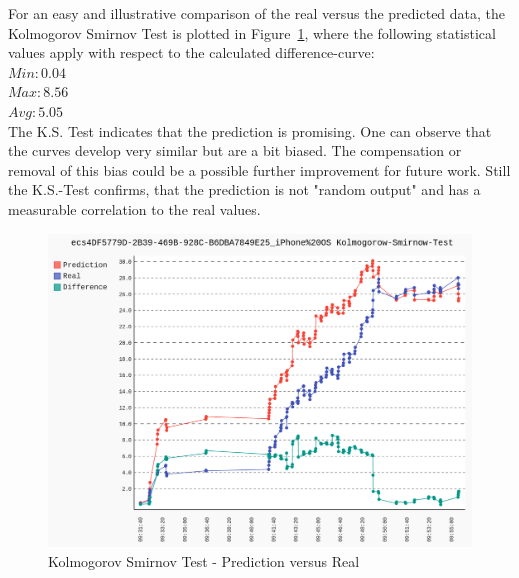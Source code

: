 For an easy and illustrative comparison of the real versus the predicted data, the Kolmogorov Smirnov Test is plotted in Figure~\ref{fig:prediction_vs_real}, where the following statistical values apply with respect to the calculated difference-curve:\\
${Min}: 0.04$\\
${Max}: 8.56$\\
${Avg}: 5.05$\\

The K.S. Test indicates that the prediction is promising.
One can observe that the curves develop very similar but are a bit biased.
The compensation or removal of this bias could be a possible further improvement for future work.
Still the K.S.-Test confirms, that the prediction is not "random output" and has a measurable correlation to the real values.

\begin{figure}[!htbp]
  \centering
  \includegraphics[keepaspectratio=true,scale=0.36]{img/prediction_vs_real}
    \caption{Kolmogorov Smirnov Test - Prediction versus Real}
  \label{fig:prediction_vs_real}
\end{figure}


